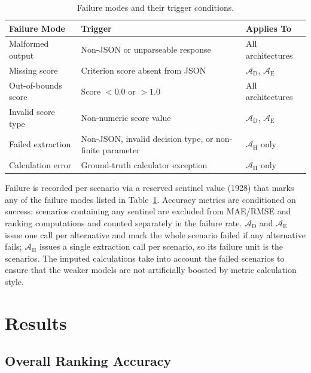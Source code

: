\documentclass[a4paper,fleqn]{cas-dc}
\begin{document}
\begin{table}[t]
\begin{threeparttable}
\footnotesize
\centering
\setlength{\tabcolsep}{5pt}
\begin{tabular}{lll}
\toprule
Failure Mode & Trigger & Applies To \\
\midrule
Malformed output & Non-JSON or unparseable response & All architectures \\
Missing score & Criterion score absent from JSON & $\mathcal{A}_{\text{D}}$, $\mathcal{A}_{\text{E}}$ \\
Out-of-bounds score & Score $< 0.0$ or $> 1.0$ & All architectures \\
Invalid score type & Non-numeric score value & $\mathcal{A}_{\text{D}}$, $\mathcal{A}_{\text{E}}$ \\
Failed extraction & Non-JSON, invalid decision type, or non-finite parameter & $\mathcal{A}_{\text{H}}$ only \\
Calculation error & Ground-truth calculator exception & $\mathcal{A}_{\text{H}}$ only \\
\bottomrule
\end{tabular}
\setlength{\tabcolsep}{6pt}
\end{threeparttable}
\caption{Failure modes and their trigger conditions.}
\label{tab:failure-modes}
\end{table}

Failure is recorded per scenario via a reserved sentinel value (1928) that marks any of the failure modes listed in Table~\ref{tab:failure-modes}. Accuracy metrics are conditioned on success: scenarios containing any sentinel are excluded from MAE/RMSE and ranking computations and counted separately in the failure rate. $\mathcal{A}_{\text{D}}$ and $\mathcal{A}_{\text{E}}$ issue one call per alternative and mark the whole scenario failed if any alternative fails; $\mathcal{A}_{\text{H}}$ issues a single extraction call per scenario, so its failure unit is the scenarios. The imputed calculations take into account the failed scenarios to ensure that the weaker models are not artificially boosted by metric calculation style.


\FloatBarrier
\section{Results}
\label{sec3}
\label{sec:results}

\FloatBarrier
\subsection{Overall Ranking Accuracy}
\label{sec:res-ranking}
\end{document}
